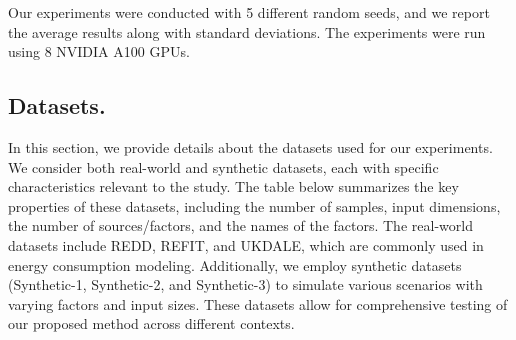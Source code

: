 \documentclass{article} %
\theoremstyle{plain}
\theoremstyle{definition}
\theoremstyle{remark}
\numberwithin{equation}{section}
\begin{document}
Our experiments were conducted with 5 different random seeds, and we report the average results along with standard deviations. The experiments were run using 8 NVIDIA A100 GPUs.




\subsection{Datasets.}
In this section, we provide details about the datasets used for our experiments. We consider both real-world and synthetic datasets, each with specific characteristics relevant to the study. The table below summarizes the key properties of these datasets, including the number of samples, input dimensions, the number of sources/factors, and the names of the factors. The real-world datasets include REDD, REFIT, and UKDALE, which are commonly used in energy consumption modeling. Additionally, we employ synthetic datasets (Synthetic-1, Synthetic-2, and Synthetic-3) to simulate various scenarios with varying factors and input sizes. These datasets allow for comprehensive testing of our proposed method across different contexts.
\begin{table}[H]
\caption{Synthetic Dataset  and Real world datasets}
\begin{center}
\end{center}
\label{table:dataset}
\end{table}
\end{document}
